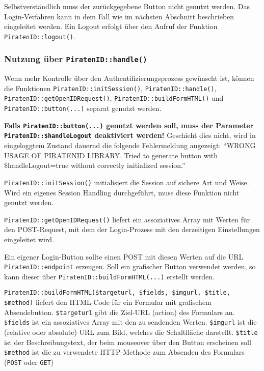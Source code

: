 Selbstverständlich muss der zurückgegebene Button nicht genutzt werden.
Das Login-Verfahren kann in dem Fall wie im nächsten Abschnitt beschrieben eingeleitet werden.
Ein Logout erfolgt über den Aufruf der Funktion \texttt{PiratenID::logout()}.

\subsubsection{Nutzung über \texttt{PiratenID::handle()}}
\label{sec:client-usage-advanced}
Wenn mehr Kontrolle über den Authentifizierungsprozess gewünscht ist, können die Funktionen
\texttt{PiratenID::initSession()}, \texttt{PiratenID::handle()}, \texttt{PiratenID::getOpenIDRequest()}, \texttt{PiratenID::buildFormHTML()}
und \texttt{PiratenID::button(...)} separat genutzt werden.

\textbf{Falls \texttt{PiratenID::button(...)} genutzt werden soll, muss der Parameter \texttt{PiratenID::\$handleLogout} deaktiviert werden!}
Geschieht dies nicht, wird in eingeloggtem Zustand dauernd die folgende Fehlermeldung angezeigt:
"`WRONG USAGE OF PIRATENID LIBRARY. Tried to generate button with \$handleLogout=true without correctly initialized session."'

\texttt{PiratenID::initSession()} initialisiert die Session auf sichere Art und Weise.
Wird ein eigenes Session Handling durchgeführt, muss diese Funktion nicht genutzt werden.

\texttt{PiratenID::getOpenIDRequest()} liefert ein assoziatives Array mit Werten für den POST-Request,
mit dem der Login-Prozess mit den derzeitigen Einstellungen eingeleitet wird.

Ein eigener Login-Button sollte einen POST mit diesen Werten auf die URL \texttt{PiratenID::endpoint} erzeugen.
Soll ein grafischer Button verwendet werden, so kann dieser über \texttt{PiratenID::buildFormHTML(...)} erstellt werden.

\texttt{PiratenID::buildFormHTML(\$targeturl, \$fields, \$imgurl, \$title, \$method)}
 liefert den HTML-Code für ein Formular mit grafischem Absendebutton.
\texttt{\$targeturl} gibt die Ziel-URL (action) des Formulars an.
\texttt{\$fields} ist ein assoziatives Array mit den zu sendenden Werten.
\texttt{\$imgurl} ist die (relative oder absolute) URL zum Bild, welches die Schaltfläche darstellt.
\texttt{\$title} ist der Beschreibungstext, der beim mouseover über den Button erscheinen soll
\texttt{\$method} ist die zu verwendete HTTP-Methode zum Absenden des Formulars (\texttt{POST} oder \texttt{GET})

